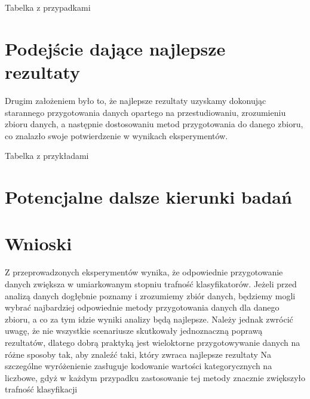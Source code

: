 \documentclass{book}
\begin{document}
Tabelka z przypadkami



\section{Podejście dające najlepsze rezultaty}

Drugim założeniem było to, że najlepsze rezultaty 
uzyskamy dokonując starannego przygotowania danych
opartego na przestudiowaniu, zrozumieniu zbioru danych, 
a następnie dostosowaniu metod przygotowania do 
danego zbioru, co znalazło swoje potwierdzenie w wynikach eksperymentów.

Tabelka z przykładami
\section{Potencjalne dalsze kierunki badań}

\section{Wnioski}

Z przeprowadzonych eksperymentów wynika, 
że odpowiednie przygotowanie danych zwiększa w umiarkowanym stopniu trafność 
klasyfikatorów. Jeżeli przed analizą danych dogłębnie poznamy i zrozumiemy zbiór danych,
będziemy mogli wybrać najbardziej odpowiednie metody przygotowania danych dla danego zbioru,
a co za tym idzie wyniki analizy będą najlepsze.
Należy jednak zwrócić uwagę, że nie wszystkie 
scenariusze skutkowały jednoznaczną poprawą rezultatów, dlatego dobrą praktyką jest
wieloktorne przygotowywanie danych na różne sposoby tak, aby znaleźć taki, który zwraca najlepsze rezultaty 
Na szczególne wyróżenienie zasługuje kodowanie wartości 
kategorycznych na liczbowe, gdyż w każdym przypadku zastosowanie 
tej metody znacznie zwiększyło trafność klasyfikacji
\end{document}
